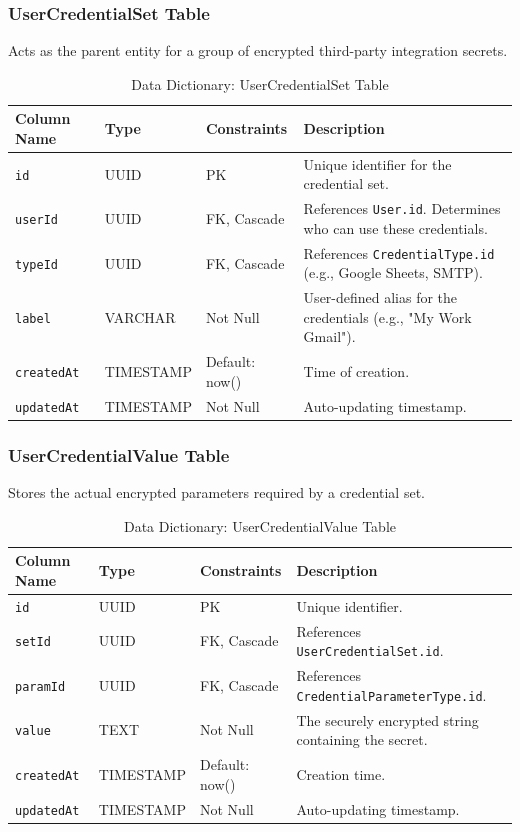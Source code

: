 \subsubsection{UserCredentialSet Table}
Acts as the parent entity for a group of encrypted third-party integration secrets.
\begin{table}[H]
\centering
\renewcommand{\arraystretch}{1.3}
\begin{tabularx}{\textwidth}{|l|l|l|X|}
\hline
\textbf{Column Name} & \textbf{Type} & \textbf{Constraints} & \textbf{Description} \\
\hline
\texttt{id} & UUID & PK & Unique identifier for the credential set. \\
\hline
\texttt{userId} & UUID & FK, Cascade & References \texttt{User.id}. Determines who can use these credentials. \\
\hline
\texttt{typeId} & UUID & FK, Cascade & References \texttt{CredentialType.id} (e.g., Google Sheets, SMTP). \\
\hline
\texttt{label} & VARCHAR & Not Null & User-defined alias for the credentials (e.g., "My Work Gmail"). \\
\hline
\texttt{createdAt} & TIMESTAMP & Default: now() & Time of creation. \\
\hline
\texttt{updatedAt} & TIMESTAMP & Not Null & Auto-updating timestamp. \\
\hline
\end{tabularx}
\caption{Data Dictionary: UserCredentialSet Table}
\label{tab:dict-credentialset}
\end{table}

\subsubsection{UserCredentialValue Table}
Stores the actual encrypted parameters required by a credential set.
\begin{table}[H]
\centering
\renewcommand{\arraystretch}{1.3}
\begin{tabularx}{\textwidth}{|l|l|l|X|}
\hline
\textbf{Column Name} & \textbf{Type} & \textbf{Constraints} & \textbf{Description} \\
\hline
\texttt{id} & UUID & PK & Unique identifier. \\
\hline
\texttt{setId} & UUID & FK, Cascade & References \texttt{UserCredentialSet.id}. \\
\hline
\texttt{paramId} & UUID & FK, Cascade & References \texttt{CredentialParameterType.id}. \\
\hline
\texttt{value} & TEXT & Not Null & The securely encrypted string containing the secret. \\
\hline
\texttt{createdAt} & TIMESTAMP & Default: now() & Creation time. \\
\hline
\texttt{updatedAt} & TIMESTAMP & Not Null & Auto-updating timestamp. \\
\hline
\end{tabularx}
\caption{Data Dictionary: UserCredentialValue Table}
\label{tab:dict-credentialvalue}
\end{table}





